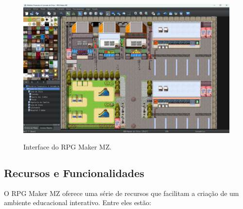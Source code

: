 \begin{figure}[ht]
	\centering
	\caption{Interface do RPG Maker MZ.}
	\includegraphics[scale=0.3]{Textuais/Pictures/RPGMaker_Interface.png}
	\label{fig:rpgmaker-interface}
\end{figure}

\subsection{Recursos e Funcionalidades}
O RPG Maker MZ oferece uma série de recursos que facilitam a criação de um ambiente educacional interativo. Entre eles estão:

